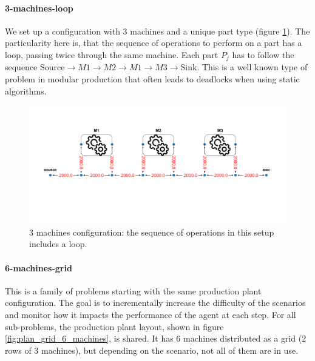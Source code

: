 \documentclass[sn-mathphys]{sn-jnl}
\begin{document}
\paragraph{3-machines-loop}

We set up a configuration with 3 machines and a unique part type (figure \ref{fig:plan_3_machines}). The particularity here is, that the sequence of operations to perform on a part has a loop, passing twice through the same machine. Each part $P_{j}$ has to follow the sequence $\text{Source} \rightarrow M1 \rightarrow M2 \rightarrow M1 \rightarrow M3 \rightarrow \text{Sink}$. This is a well known type of problem in modular production that often leads to deadlocks when using static algorithms.

\begin{figure}[ht]
  \includegraphics[width=1.0\textwidth]{plan_3_machines.png}
  \caption{3 machines configuration: the sequence of operations in this setup includes a loop.}
  \label{fig:plan_3_machines}
\end{figure}

\paragraph{6-machines-grid}

This is a family of problems starting with the same production plant configuration. The goal is to incrementally increase the difficulty of the scenarios and monitor how it impacts the performance of the agent at each step. For all sub-problems, the production plant layout, shown in figure \ref{fig:plan_grid_6_machines}, is shared. It has 6 machines distributed as a grid (2 rows of 3 machines), but depending on the scenario, not all of them are in use.
\end{document}
